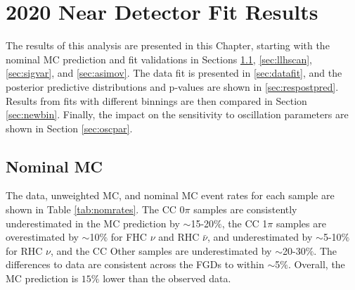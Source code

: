 \chapter{2020 Near Detector Fit Results}\label{sec:2020Fit}

The results of this analysis are presented in this Chapter, starting with the nominal MC prediction and fit validations in Sections \ref{sec:nommc}, \ref{sec:llhscan}, \ref{sec:sigvar}, and \ref{sec:asimov}. The data fit is presented in \ref{sec:datafit}, and the posterior predictive distributions and p-values are shown in \ref{sec:respostpred}. Results from fits with different binnings are then compared in Section \ref{sec:newbin}. Finally, the impact on the sensitivity to oscillation parameters are shown in Section \ref{sec:oscpar}.

\section{Nominal MC}\label{sec:nommc}

The data, unweighted MC, and nominal MC event rates for each sample are shown in Table \ref{tab:nomrates}. The CC 0$\pi$ samples are consistently underestimated in the MC prediction by $\sim$15-20$\%$, the CC 1$\pi$ samples are overestimated by $\sim$10$\%$ for FHC $\nu$ and RHC $\bar{\nu}$, and underestimated by $\sim$5-10$\%$ for RHC $\nu$, and the CC Other samples are underestimated by $\sim$20-30$\%$. The differences to data are consistent across the FGDs to within $\sim$5$\%$. Overall, the MC prediction is $15\%$ lower than the observed data.

